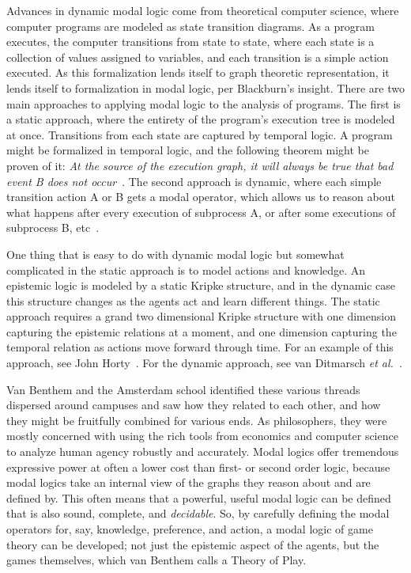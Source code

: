 Advances in dynamic modal logic come from theoretical computer science, where computer programs are modeled as state transition diagrams. As a program executes, the computer transitions from state to state, where each state is a collection of values assigned to variables, and each transition is a simple action executed. As this formalization lends itself to graph theoretic representation, it lends itself to formalization in modal logic, per Blackburn's insight. There are two main approaches to applying modal logic to the analysis of programs. The first is a static approach, where the entirety of the program's execution tree is modeled at once. Transitions from each state are captured by temporal logic. A program might be formalized in temporal logic, and the following theorem might be proven of it: \emph{At the source of the execution graph, it will always be true that bad event B does not occur}~\cite{Pnueli}. The second approach is dynamic, where each simple transition action A or B gets a modal operator, which allows us to reason about what happens after every execution of subprocess A, or after some executions of subprocess B, etc~\cite{HarelKozenTiuryn}. 

One thing that is easy to do with dynamic modal logic but somewhat complicated in the static approach is to model actions and knowledge. An epistemic logic is modeled by a static Kripke structure, and in the dynamic case this structure changes as the agents act and learn different things. The static approach requires a grand two dimensional Kripke structure with one dimension capturing the epistemic relations at a moment, and one dimension capturing the temporal relation as actions move forward through time. For an example of this approach, see John Horty~\cite{Horty}. For the dynamic approach, see van Ditmarsch \emph{et al.}~\cite{DEL}. 

Van Benthem and the Amsterdam school identified these various threads dispersed around campuses and saw how they related to each other, and how they might be fruitfully combined for various ends. As philosophers, they were mostly concerned with using the rich tools from economics and computer science to analyze human agency robustly and accurately. Modal logics offer tremendous expressive power at often a lower cost than first- or second order logic, because modal logics take an internal view of the graphs they reason about and are defined by. This often means that a powerful, useful modal logic can be defined that is also sound, complete, and \emph{decidable}. So, by carefully defining the modal operators for, say, knowledge, preference, and action, a modal logic of game theory can be developed; not just the epistemic aspect of the agents, but the games themselves, which van Benthem calls a Theory of Play. 


